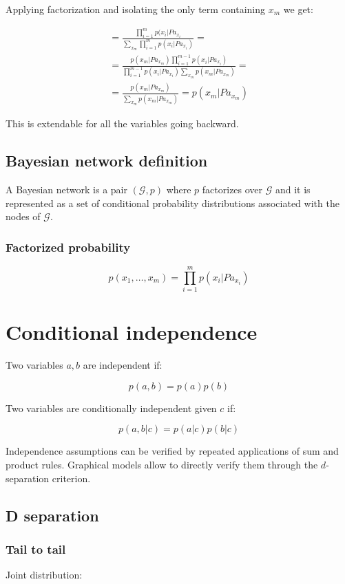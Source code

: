 		Applying factorization and isolating the only term containing $x_m$ we get:

		\begin{align*}
			=\frac{\prod\limits_{i=1}^mp(x_i|Pa_{x_i}}{\sum\limits_{x_m}\prod\limits_{i=1}^mp(x_i | Pa_{x_i})} =\\
			=\frac{p(x_m|Pa_{x_m})\prod\limits_{i=1}^{m-1}p(x_i | Pa_{x_i})}{\prod\limits_{i=1}^{m-1}p(x_i|Pa_{x_i})\sum\limits_{x_m}p(x_m|Pa_{x_m})}=\\
			=\frac{p(x_m|Pa_{x_m})}{\sum\limits_{x_m}p(x_m|Pa_{x_m})} = p(x_m|Pa_{x_m})
		\end{align*}

		This is extendable for all the variables going backward.

	\subsection{Bayesian network definition}
	A Bayesian network is a pair $(\mathcal{G}, p)$ where $p$ factorizes over $\mathcal{G}$ and it is represented as a set of conditional probability distributions associated with the nodes of $\mathcal{G}$.

		\subsubsection{Factorized probability}

		$$p(x_1, \dots, x_m) = \prod\limits_{i =1}^m p(x_i | Pa_{x_i})$$


\section{Conditional independence}
Two variables $a,b$ are independent if:

$$p(a,b) = p(a)p(b)$$

Two variables are conditionally independent given $c$ if:

$$p(a,b|c) = p(a|c)p(b|c)$$

Independence assumptions can be verified by repeated applications of sum and product rules.
Graphical models allow to directly verify them through the $d$-separation criterion.

	\subsection{D separation}

		\subsubsection{Tail to tail}
		Joint distribution:

